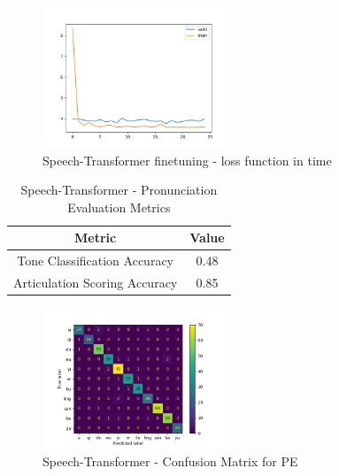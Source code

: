 \documentclass[conference]{IEEEtran}
\begin{document}
\begin{figure}[hbtp]
    \centerline{\includegraphics[width=0.5\textwidth]{Figures/Fig_ST_Finetuning_loss.png}}
    \caption{Speech-Transformer finetuning - loss function in time}
    \label{STLossFT} %
    \end{figure}

\begin{table}[hbtp]
\caption{Speech-Transformer - Pronunciation Evaluation Metrics}
\begin{center}
\begin{tabular}{|c|c|}
\hline
\textbf{Metric} & {\textbf{Value}} \\
\hline
Tone Classification Accuracy & 0.48 \\
\hline
Articulation Scoring Accuracy & 0.85 \\
\hline
\end{tabular}
\label{tab_STPE}
\end{center}
\end{table}

\begin{figure}[hbtp]
\centerline{\includegraphics[width=0.5\textwidth]{Figures/Fig_STPE.png}}
\caption{Speech-Transformer - Confusion Matrix for PE}
\label{fig_STPE} %
\end{figure}
\end{document}
